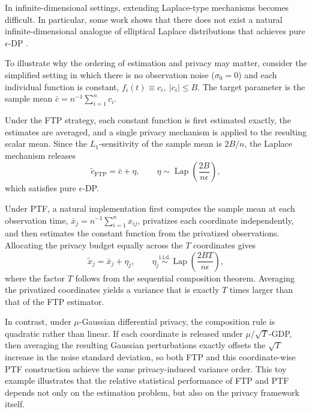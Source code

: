 \documentclass[twoside,11pt]{article}
\begin{document}
In infinite-dimensional settings, extending Laplace-type mechanisms becomes difficult. In particular, some work shows that there does not exist a natural infinite-dimensional analogue of elliptical Laplace distributions that achieves pure $\epsilon$-DP \citep{reimherr2019elliptical}.

\begin{example}
\label{ex: A motivating constant-function example}
To illustrate why the ordering of estimation and privacy may matter, consider the simplified setting in which there is no observation noise ($\sigma_0=0$) and each individual function is constant, $f_i(t)\equiv c_i,\ |c_i|\le B$. The target parameter is the sample mean $\bar c=n^{-1}\sum_{i=1}^n c_i$. 

Under the FTP strategy, each constant function is first estimated exactly, the estimates are averaged, and a single privacy mechanism is applied to the resulting scalar mean. Since the $L_1$-sensitivity of the sample mean is $2B/n$, the Laplace mechanism releases
\[
\widetilde c_{\mathrm{FTP}}
=
\bar c + \eta,
\qquad
\eta\sim \operatorname{Lap}
\!\left(
\frac{2B}{n\epsilon}
\right),
\]
which satisfies pure $\epsilon$-DP.

Under PTF, a natural implementation first computes the sample mean at each observation time, $\bar x_j=n^{-1}\sum_{i=1}^n x_{ij}$, privatizes each coordinate independently, and then estimates the constant function from the privatized observations. Allocating the privacy budget equally across the $T$ coordinates gives
\[
\widetilde x_j
=
\bar x_j
+
\eta_j,
\qquad
\eta_j
\overset{\text{i.i.d.}}{\sim}
\operatorname{Lap}
\!\left(
\frac{2BT}{n\epsilon}
\right),
\]
where the factor $T$ follows from the sequential composition theorem. Averaging the privatized coordinates yields a variance that is exactly $T$ times larger than that of the FTP estimator.

In contrast, under $\mu$-Gaussian differential privacy, the composition rule is quadratic rather than linear. If each coordinate is released under $\mu/\sqrt{T}$-GDP, then averaging the resulting Gaussian perturbations exactly offsets the $\sqrt{T}$ increase in the noise standard deviation, so both FTP and this coordinate-wise PTF construction achieve the same privacy-induced variance order. This toy example illustrates that the relative statistical performance of FTP and PTF depends not only on the estimation problem, but also on the privacy framework itself.
\end{example}
\end{document}
